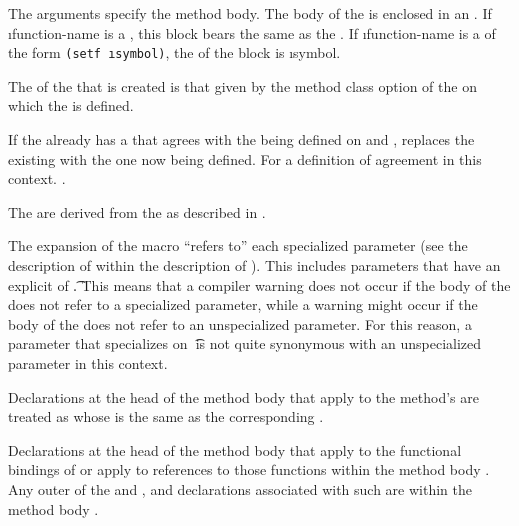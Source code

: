 The  arguments specify the method body.
The body of the  is enclosed in an .  If
\i{function-name} is a , 
this block bears the same  as the .  
If \i{function-name} is a  of the form 
{\tt (setf \i{symbol})}, the  of the block is \i{symbol}.  
 
The  of the   that is created is that given by the 
method class option of the  
on which the  is defined.
 
If the  already has a  that agrees with the
 being defined on  and ,
 replaces the existing  with the one now being
defined.
For a definition of agreement in this context.
\seesection\SpecializerQualifierAgreement.
 
The  are derived from 
the  as described in
\secref\IntroToMethods.

The expansion of the  macro ``refers to'' each
specialized parameter (see the description of  
within the description of ).
This includes parameters that
have an explicit  of \t.  This means
that a compiler warning does not occur if the body of the  does
not refer to a specialized parameter, while a warning might occur
if the body of the  does not refer to an unspecialized parameter.
For this reason, a parameter that specializes on \t\ is not quite synonymous
with an unspecialized parameter in this context.
 
Declarations at the head of the method body that apply to the 
method's  are treated as 
whose  is the same as the corresponding .

Declarations at the head of the method body that apply to the 
functional bindings of  or 
apply to references to those functions within the method body .
Any outer  of the   and
, and declarations associated with such 
are  within the method body .

